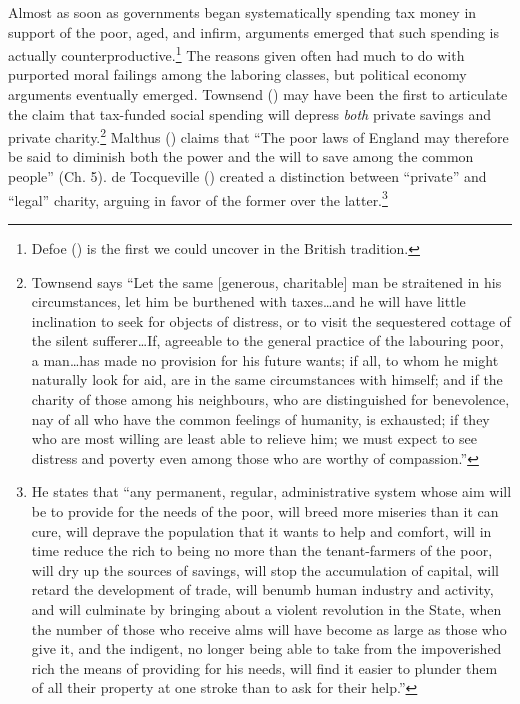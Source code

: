 \documentclass[
  11pt,
  oneside]{article}
\begin{document}
Almost as soon as governments began systematically spending tax money in support of the poor, aged, and infirm, arguments emerged that such spending is actually counterproductive.\footnote{Defoe () is the first we could uncover in the British tradition.} The reasons given often had much to do with purported moral failings among the laboring classes, but political economy arguments eventually emerged. Townsend () may have been the first to articulate the claim that tax-funded social spending will depress \emph{both} private savings and private charity.\footnote{Townsend says ``Let the same {[}generous, charitable{]} man be straitened in his circumstances, let him be burthened with taxes\ldots and he will have little inclination to seek for objects of distress, or to visit the sequestered cottage of the silent sufferer\ldots If, agreeable to the general practice of the labouring poor, a man\ldots has made no provision for his future wants; if all, to whom he might naturally look for aid, are in the same circumstances with himself; and if the charity of those among his neighbours, who are distinguished for benevolence, nay of all who have the common feelings of humanity, is exhausted; if they who are most willing are least able to relieve him; we must expect to see distress and poverty even among those who are worthy of compassion.''} Malthus () claims that ``The poor laws of England may therefore be said to diminish both the power and the will to save among the common people'' (Ch. 5). de Tocqueville () created a distinction between ``private'' and ``legal'' charity, arguing in favor of the former over the latter.\footnote{He states that ``any permanent, regular, administrative system whose aim will be to provide for the needs of the poor, will breed more miseries than it can cure, will deprave the population that it wants to help and comfort, will in time reduce the rich to being no more than the tenant-farmers of the poor, will dry up the sources of savings, will stop the accumulation of capital, will retard the development of trade, will benumb human industry and activity, and will culminate by bringing about a violent revolution in the State, when the number of those who receive alms will have become as large as those who give it, and the indigent, no longer being able to take from the impoverished rich the means of providing for his needs, will find it easier to plunder them of all their property at one stroke than to ask for their help.''}
\end{document}
